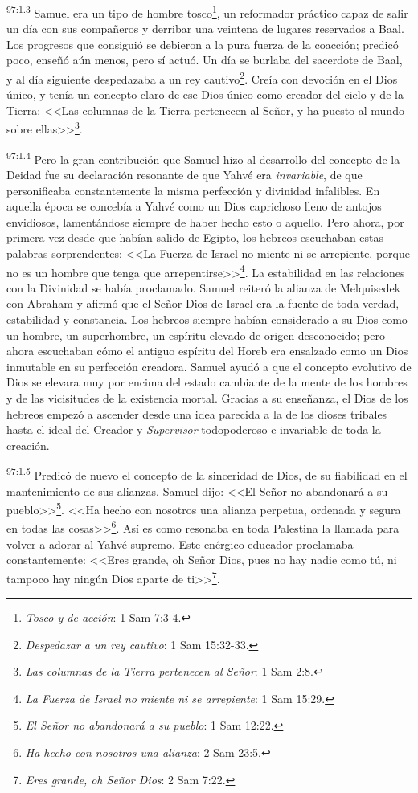 \par
\textsuperscript{97:1.3} Samuel era un tipo de hombre tosco\footnote{\textit{Tosco y de acción}: 1 Sam 7:3-4.}, un reformador práctico capaz de salir un día con sus compañeros y derribar una veintena de lugares reservados a Baal. Los progresos que consiguió se debieron a la pura fuerza de la coacción; predicó poco, enseñó aún menos, pero sí actuó. Un día se burlaba del sacerdote de Baal, y al día siguiente despedazaba a un rey cautivo\footnote{\textit{Despedazar a un rey cautivo}: 1 Sam 15:32-33.}. Creía con devoción en el Dios único, y tenía un concepto claro de ese Dios único como creador del cielo y de la Tierra: <<Las columnas de la Tierra pertenecen al Señor, y ha puesto al mundo sobre ellas>>\footnote{\textit{Las columnas de la Tierra pertenecen al Señor}: 1 Sam 2:8.}.

\par
\textsuperscript{97:1.4} Pero la gran contribución que Samuel hizo al desarrollo del concepto de la Deidad fue su declaración resonante de que Yahvé era \textit{invariable}, de que personificaba constantemente la misma perfección y divinidad infalibles. En aquella época se concebía a Yahvé como un Dios caprichoso lleno de antojos envidiosos, lamentándose siempre de haber hecho esto o aquello. Pero ahora, por primera vez desde que habían salido de Egipto, los hebreos escuchaban estas palabras sorprendentes: <<La Fuerza de Israel no miente ni se arrepiente, porque no es un hombre que tenga que arrepentirse>>\footnote{\textit{La Fuerza de Israel no miente ni se arrepiente}: 1 Sam 15:29.}. La estabilidad en las relaciones con la Divinidad se había proclamado. Samuel reiteró la alianza de Melquisedek con Abraham y afirmó que el Señor Dios de Israel era la fuente de toda verdad, estabilidad y constancia. Los hebreos siempre habían considerado a su Dios como un hombre, un superhombre, un espíritu elevado de origen desconocido; pero ahora escuchaban cómo el antiguo espíritu del Horeb era ensalzado como un Dios inmutable en su perfección creadora. Samuel ayudó a que el concepto evolutivo de Dios se elevara muy por encima del estado cambiante de la mente de los hombres y de las vicisitudes de la existencia mortal. Gracias a su enseñanza, el Dios de los hebreos empezó a ascender desde una idea parecida a la de los dioses tribales hasta el ideal del Creador y \textit{Supervisor} todopoderoso e invariable de toda la creación.

\par
\textsuperscript{97:1.5} Predicó de nuevo el concepto de la sinceridad de Dios, de su fiabilidad en el mantenimiento de sus alianzas. Samuel dijo: <<El Señor no abandonará a su pueblo>>\footnote{\textit{El Señor no abandonará a su pueblo}: 1 Sam 12:22.}. <<Ha hecho con nosotros una alianza perpetua, ordenada y segura en todas las cosas>>\footnote{\textit{Ha hecho con nosotros una alianza}: 2 Sam 23:5.}. Así es como resonaba en toda Palestina la llamada para volver a adorar al Yahvé supremo. Este enérgico educador proclamaba constantemente: <<Eres grande, oh Señor Dios, pues no hay nadie como tú, ni tampoco hay ningún Dios aparte de ti>>\footnote{\textit{Eres grande, oh Señor Dios}: 2 Sam 7:22.}.


